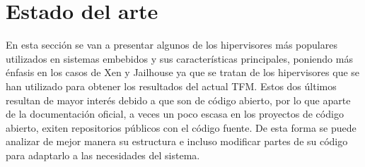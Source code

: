 \chapter{Estado del arte}
En esta sección se van a presentar algunos de los hipervisores más populares utilizados en sistemas embebidos y sus características principales, poniendo más énfasis en los casos de Xen y Jailhouse ya que se tratan de los hipervisores que se han utilizado para obtener los resultados del actual TFM. Estos dos últimos resultan de mayor interés debido a que son de código abierto, por lo que aparte de la documentación oficial, a veces un poco escasa en los proyectos de código abierto, exiten repositorios públicos con el código fuente. De esta forma se puede analizar de mejor manera su estructura e incluso modificar partes de su código para adaptarlo a las necesidades del sistema.

